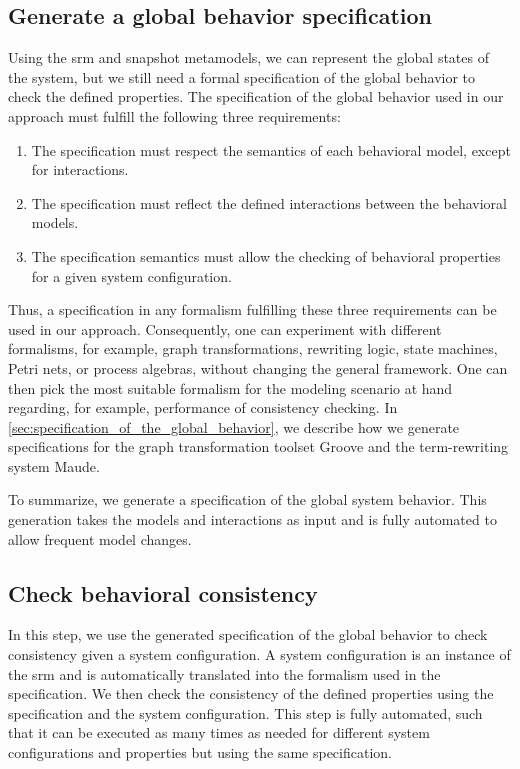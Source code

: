 \documentclass{jot}
\begin{document}
\subsection{Generate a global behavior specification}
Using the \gls*{srm} and snapshot metamodels, we can represent the global states of the system, but we still need a formal specification of the global behavior to check the defined properties.
The specification of the global behavior used in our approach must fulfill the following three requirements:
\begin{enumerate}
    \item The specification must respect the semantics of each behavioral model, except for interactions.
    \item The specification must reflect the defined interactions between the behavioral models.
    \item The specification semantics must allow the checking of behavioral properties for a given system configuration.
\end{enumerate}
Thus, a specification in any formalism fulfilling these three requirements can be used in our approach.
Consequently, one can experiment with different formalisms, for example, graph transformations, rewriting logic, state machines, Petri nets, or process algebras, without changing the general framework.
One can then pick the most suitable formalism for the modeling scenario at hand regarding, for example, performance of consistency checking.
In \cref{sec:specification_of_the_global_behavior}, we describe how we generate specifications for the graph transformation toolset Groove and the term-rewriting system Maude.

To summarize, we generate a specification of the global system behavior.
This generation takes the models and interactions as input and is fully automated to allow frequent model changes.


\subsection{Check behavioral consistency}
In this step, we use the generated specification of the global behavior to check consistency given a system configuration.
A system configuration is an instance of the \gls*{srm} and is automatically translated into the formalism used in the specification.
We then check the consistency of the defined properties using the specification and the system configuration.
This step is fully automated, such that it can be executed as many times as needed for different system configurations and properties but using the same specification.
\end{document}
